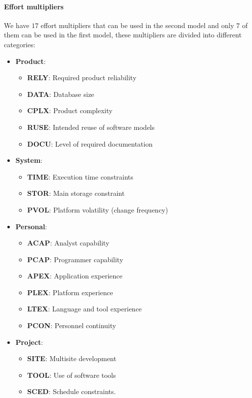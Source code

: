 \paragraph{Effort multipliers}
We have $17$ effort multipliers that can be used in the second model and only $7$ of them can be used in the first model, these multipliers are divided into different categories:
\begin{itemize}
    \item \textbf{Product}:
          \begin{itemize}
              \item \textbf{RELY}: Required product reliability
              \item \textbf{DATA}: Database size
              \item \textbf{CPLX}: Product complexity
              \item \textbf{RUSE}: Intended reuse of software models
              \item \textbf{DOCU}: Level of required documentation
          \end{itemize}
    \item \textbf{System}:
          \begin{itemize}
              \item \textbf{TIME}: Execution time constraints
              \item \textbf{STOR}: Main storage constraint
              \item \textbf{PVOL}: Platform volatility (change frequency)
          \end{itemize}
    \item \textbf{Personal}:
          \begin{itemize}
              \item \textbf{ACAP}: Analyst capability
              \item \textbf{PCAP}: Programmer capability
              \item \textbf{APEX}: Application experience
              \item \textbf{PLEX}: Platform experience
              \item \textbf{LTEX}: Language and tool experience
              \item \textbf{PCON}: Personnel continuity
          \end{itemize}
    \item \textbf{Project}:
          \begin{itemize}
              \item \textbf{SITE}: Multisite development
              \item \textbf{TOOL}: Use of software tools
              \item \textbf{SCED}: Schedule constraints.
          \end{itemize}
\end{itemize}
